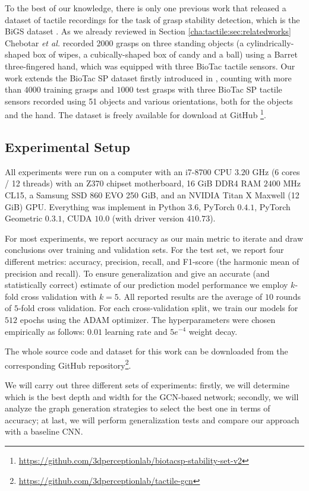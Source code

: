 To the best of our knowledge, there is only one previous work that released a dataset of tactile recordings for the task of grasp stability detection, which is the BiGS dataset \cite{Chebotar2016bigs}. As we already reviewed in Section \ref{cha:tactile:sec:relatedworks} Chebotar \emph{et al.} recorded 2000 grasps on three standing objects (a cylindrically-shaped box of wipes, a cubically-shaped box of candy and a ball) using a Barret three-fingered hand, which was equipped with three BioTac tactile sensors. Our work extends the BioTac SP dataset firstly introduced in \cite{Zapata2018}, counting with more than $4000$ training grasps and $1000$ test grasps with three BioTac SP tactile sensors recorded using 51 objects and various orientations, both for the objects and the hand. The dataset is freely available for download at GitHub \footnote{\url{https://github.com/3dperceptionlab/biotacsp-stability-set-v2}}.

\subsection{Experimental Setup}

All experiments were run on a computer with an i7-8700 CPU \@ $3.20$ GHz (6 cores / 12 threads) with an Z370 chipset motherboard, 16 GiB DDR4 RAM \@ $2400$ MHz CL15, a Samsung SSD 860 EVO 250 GiB, and an NVIDIA Titan X Maxwell (12 GiB) GPU. Everything was implement in Python $3.6$, PyTorch $0.4.1$, PyTorch Geometric $0.3.1$, CUDA $10.0$ (with driver version $410.73$).

For most experiments, we report accuracy as our main metric to iterate and draw conclusions over training and validation sets. For the test set, we report four different metrics: accuracy, precision, recall, and F1-score (the harmonic mean of precision and recall). To ensure generalization and give an accurate (and statistically correct) estimate of our prediction model performance we employ $k$-fold cross validation with $k=5$. All reported results are the average of $10$ rounds of $5$-fold cross validation. For each cross-validation split, we train our models for $512$ epochs using the ADAM optimizer. The hyperparameters were chosen empirically as follows: $0.01$ learning rate and $5e^{-4}$ weight decay.

The whole source code and dataset for this work can be downloaded from the corresponding GitHub repository\footnote{\url{https://github.com/3dperceptionlab/tactile-gcn}}.

We will carry out three different sets of experiments: firstly, we will determine which is the best depth and width for the \ac{GCN}-based network; secondly, we will analyze the graph generation strategies to select the best one in terms of accuracy; at last, we will perform generalization tests and compare our approach with a baseline \ac{CNN}.

